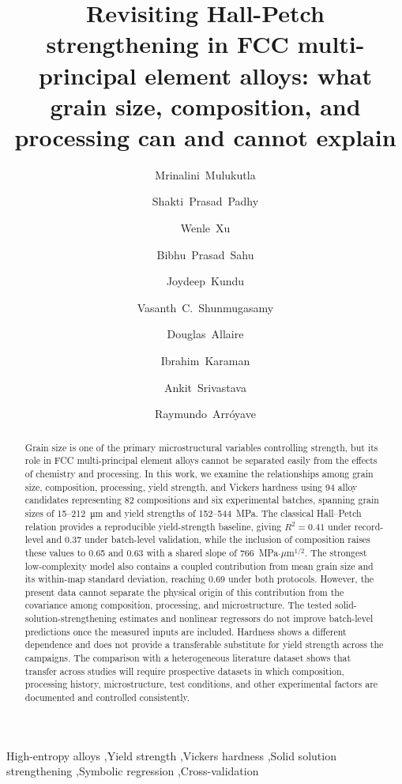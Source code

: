 \documentclass[5p,times,twocolumn]{elsarticle}
\begin{document}
\begin{frontmatter}

\title{Revisiting Hall-Petch strengthening in FCC multi-principal element alloys: what grain size, composition, and processing can and cannot explain}

\author[mse]{Mrinalini~Mulukutla}
\author[mse,mae]{Shakti~Prasad~Padhy}
\author[mse]{Wenle~Xu}
\author[mse]{Bibhu~Prasad~Sahu}
\author[mse]{Joydeep~Kundu}
\author[mse]{Vasanth~C.~Shunmugasamy}
\author[mae]{Douglas~Allaire}
\author[mse]{Ibrahim~Karaman}
\author[mse]{Ankit~Srivastava}
\author[mse,mae]{Raymundo~Arr\'{o}yave}

\begin{abstract}
Grain size is one of the primary microstructural variables controlling strength, but its role in FCC multi-principal element alloys cannot be separated easily from the effects of chemistry and processing. In this work, we examine the relationships among grain size, composition, processing, yield strength, and Vickers hardness using 94 alloy candidates representing 82 compositions and six experimental batches, spanning grain sizes of 15--212~\si{\micro\meter} and yield strengths of 152--544~MPa. The classical Hall--Petch relation provides a reproducible yield-strength baseline, giving $R^2=0.41$ under record-level and 0.37 under batch-level validation, while the inclusion of composition raises these values to 0.65 and 0.63 with a shared slope of 766~MPa$\cdot\mu$m$^{1/2}$. The strongest low-complexity model also contains a coupled contribution from mean grain size and its within-map standard deviation, reaching 0.69 under both protocols. However, the present data cannot separate the physical origin of this contribution from the covariance among composition, processing, and microstructure. The tested solid-solution-strengthening estimates and nonlinear regressors do not improve batch-level predictions once the measured inputs are included. Hardness shows a different dependence and does not provide a transferable substitute for yield strength across the campaigns. The comparison with a heterogeneous literature dataset shows that transfer across studies will require prospective datasets in which composition, processing history, microstructure, test conditions, and other experimental factors are documented and controlled consistently.
\end{abstract}

\begin{keyword}
High-entropy alloys \sep Yield strength \sep Vickers hardness \sep Solid solution strengthening \sep Symbolic regression \sep Cross-validation
\end{keyword}
\end{frontmatter}
\end{document}
